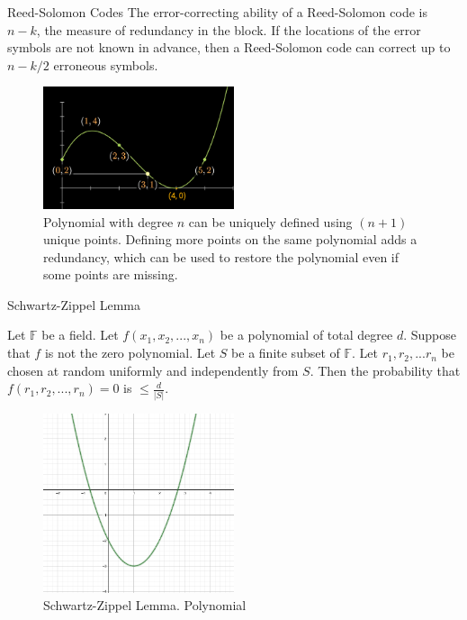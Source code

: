 \documentclass{beamer}
\begin{document}
    \begin{frame}{Reed-Solomon Codes}
        The error-correcting ability of a Reed-Solomon code is $n-k$, the measure of redundancy in the block. 
        If the locations of the error symbols are not known in advance, then a Reed-Solomon code can correct up to
        $n-k/2$ erroneous symbols.
  
        \begin{figure}
          \centering
          \includegraphics[width=0.5\textwidth]{images/lecture_2/reed-solomon-2.png}
          \caption{Polynomial with degree $n$ can be uniquely defined using $(n+1)$ unique points. Defining more points on the same polynomial adds a redundancy, which can be used to restore the polynomial even if some points are missing.}
          \label{fig:reed-2}
        \end{figure}
    \end{frame}


    \begin{frame}{Schwartz-Zippel Lemma}
        \begin{definition}
        Let $\mathbb{F}$ be a field. Let $f(x_1, x_2, ..., x_n)$ be a polynomial of total degree $d$. Suppose that $f$ is not the zero polynomial. Let $S$ be
        a finite subset of $\mathbb{F}$. Let $r_1, r_2, ... r_n$ be chosen at random uniformly and independently from $S$. Then the probability that 
        $f(r_1, r_2, ..., r_n) = 0$ is $\le \frac{d}{|S|}$.
        \end{definition}
  
        \begin{figure}
          \centering
          \includegraphics[width=0.5\textwidth]{images/lecture_2/Schwartz-Zippel-1.png}
          \caption{Schwartz-Zippel Lemma. Polynomial}
          \label{fig:schwartz-1}
        \end{figure}
    \end{frame}
\end{document}
